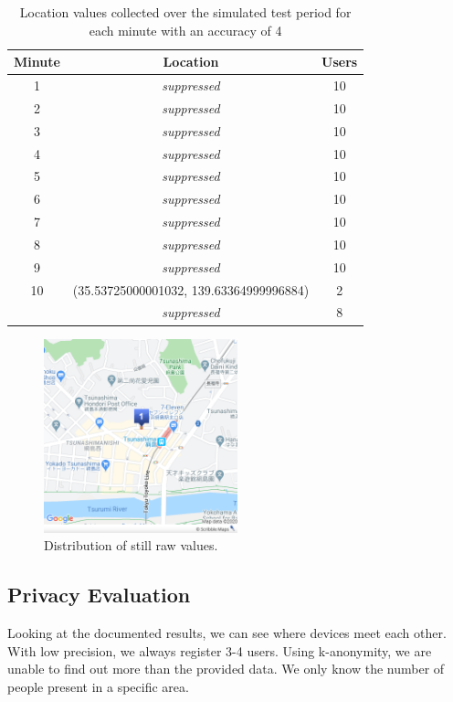 \begin{table}[htbp]
	\centering
	\begin{tabular}{|c c c|} 
		\hline
		Minute & Location & Users\\ [0.5ex] 
		\hline\hline
		1 & \textit{suppressed} & 10 \\
		\hline
		2 &\textit{suppressed}& 10 \\
		\hline
		3 &\textit{suppressed}& 10 \\
		\hline
		4 &\textit{suppressed}& 10 \\
		\hline
		5 &\textit{suppressed}& 10 \\
		\hline
		6 &\textit{suppressed}& 10 \\
		\hline
		7 &\textit{suppressed}& 10 \\
		\hline
		8 &\textit{suppressed}& 10 \\
		\hline
		9 &\textit{suppressed}& 10 \\
		\hline
		10 & (35.53725000001032, 139.63364999996884) & 2 \\ 
		&\textit{suppressed}& 8 \\ 
		\hline
	\end{tabular}
	\caption{Location values collected over the simulated test period for each minute with an accuracy of 4}
	\label{tab:location_sim4}
\end{table}

\begin{figure}[htbp]
  \centering
  \includegraphics[width=0.5\textwidth]{figures/acc4}
  \caption{Distribution of still raw values.} \label{fig:acc4}
\end{figure}

\subsection{Privacy Evaluation}
Looking at the documented results, we can see where devices meet each other. With low precision, we always register 3-4 users. Using k-anonymity, we are unable to find out more than the provided data. We only know the number of people present in a specific area. 

